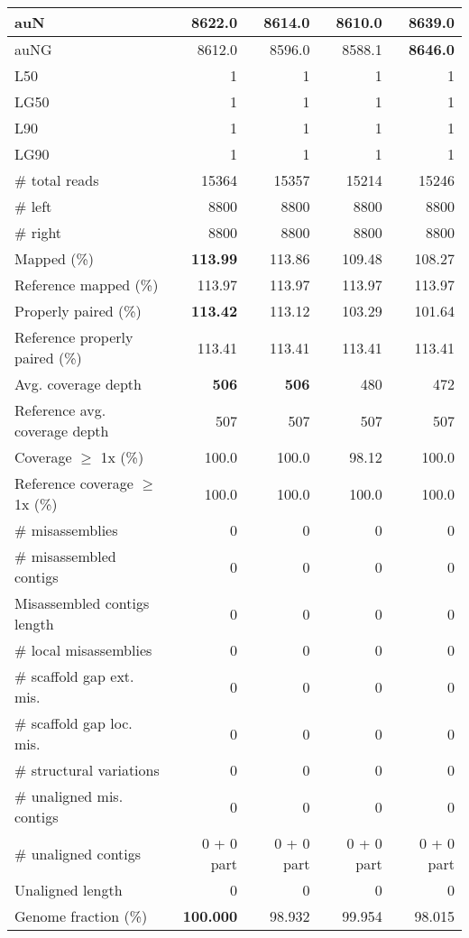 \documentclass[12pt,a4paper]{article}
\begin{document}
\begin{table}[ht]
\begin{center}
\begin{tabular}{|l*{4}{|r}|}
auN & 8622.0 & 8614.0 & 8610.0 & {\bf 8639.0} \\ \hline
auNG & 8612.0 & 8596.0 & 8588.1 & {\bf 8646.0} \\ \hline
L50 & 1 & 1 & 1 & 1 \\ \hline
LG50 & 1 & 1 & 1 & 1 \\ \hline
L90 & 1 & 1 & 1 & 1 \\ \hline
LG90 & 1 & 1 & 1 & 1 \\ \hline
\# total reads & 15364 & 15357 & 15214 & 15246 \\ \hline
\# left & 8800 & 8800 & 8800 & 8800 \\ \hline
\# right & 8800 & 8800 & 8800 & 8800 \\ \hline
Mapped (\%) & {\bf 113.99} & 113.86 & 109.48 & 108.27 \\ \hline
Reference mapped (\%) & 113.97 & 113.97 & 113.97 & 113.97 \\ \hline
Properly paired (\%) & {\bf 113.42} & 113.12 & 103.29 & 101.64 \\ \hline
Reference properly paired (\%) & 113.41 & 113.41 & 113.41 & 113.41 \\ \hline
Avg. coverage depth & {\bf 506} & {\bf 506} & 480 & 472 \\ \hline
Reference avg. coverage depth & 507 & 507 & 507 & 507 \\ \hline
Coverage $\geq$ 1x (\%) & 100.0 & 100.0 & 98.12 & 100.0 \\ \hline
Reference coverage $\geq$ 1x (\%) & 100.0 & 100.0 & 100.0 & 100.0 \\ \hline
\# misassemblies & 0 & 0 & 0 & 0 \\ \hline
\# misassembled contigs & 0 & 0 & 0 & 0 \\ \hline
Misassembled contigs length & 0 & 0 & 0 & 0 \\ \hline
\# local misassemblies & 0 & 0 & 0 & 0 \\ \hline
\# scaffold gap ext. mis. & 0 & 0 & 0 & 0 \\ \hline
\# scaffold gap loc. mis. & 0 & 0 & 0 & 0 \\ \hline
\# structural variations & 0 & 0 & 0 & 0 \\ \hline
\# unaligned mis. contigs & 0 & 0 & 0 & 0 \\ \hline
\# unaligned contigs & 0 + 0 part & 0 + 0 part & 0 + 0 part & 0 + 0 part \\ \hline
Unaligned length & 0 & 0 & 0 & 0 \\ \hline
Genome fraction (\%) & {\bf 100.000} & 98.932 & 99.954 & 98.015 \\ \hline

\end{tabular}
\end{center}
\end{table}
\end{document}
